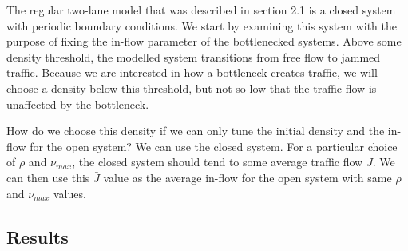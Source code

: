 \documentclass[11pt]{article}
\begin{document}
	The regular two-lane model that was described in section 2.1 is a closed system with periodic boundary conditions. We start by examining this system with the purpose of fixing the in-flow parameter of the bottlenecked systems. Above some density threshold, the modelled system transitions from free flow to jammed traffic\cite{LubeckSchreckPhase}. Because we are interested in how a bottleneck creates traffic, we will choose a density below this threshold, but not so low that the traffic flow is unaffected by the bottleneck.
	
	How do we choose this density if we can only tune the initial density and the in-flow for the open system? We can use the closed system. For a particular choice of $\rho$ and $\nu_{max}$, the closed system should tend to some average traffic flow $\bar{J}$. We can then use this $\bar{J}$ value as the average in-flow for the open system with same $\rho$ and $\nu_{max}$ values.
	
	\subsection{Results}\label{subsec:regresults}
	
	
	
	\newpage
	
	
	
	
\end{document}
